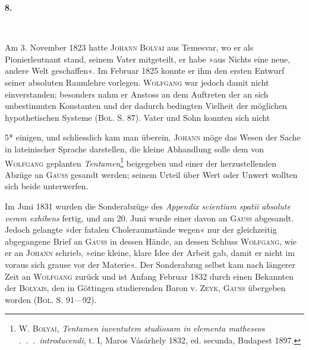 \clearpage\begingroup{}
\renewcommand{\thefootnote}{\arabic{footnote})}\setcounter{footnote}{0}
\begin{center}
\textbf{8.}\par\smallskip
{}\\
\end{center}
\noindent\hspace*{\parindent}Am 3. November 1823 hatte \textsc{Johann Bolyai} aus Temesvar, wo er als
Pionierleutnant stand, seinem Vater mitgeteilt, er habe »aus Nichts eine neue,
andere Welt geschaffen«. Im Februar 1825 konnte er ihm den ersten Entwurf
seiner absoluten Raumlehre vorlegen. \textsc{Wolfgang} war jedoch damit nicht
einverstanden; besonders nahm er Anstoss an dem Auftreten der an sich unbestimmten
Konstanten und der dadurch bedingten Vielheit der möglichen
hypothetischen Systeme (\textsc{Bol.} S. 87). Vater und Sohn konnten sich nicht
\par\vfill\hfill{\footnotesize 5*}\hspace*{2em}
\clearpage{}\setcounter{footnote}{0}
\noindent einigen, und schliesslich kam man überein, \textsc{Johann} möge das Wesen der Sache
in lateinischer Sprache darstellen, die kleine Abhandlung solle dem von \textsc{Wolfgang}
geplanten \textit{Tentamen}\footnote{W. \textsc{Bolyai}, \textit{Tentamen iuventutem studiosam in elementa matheseos .\ .\ .\ introducendi}, t. I, Maros Vásárhely 1832, ed. secunda, Budapest 1897.} beigegeben und einer der herzustellenden Abzüge
an \textsc{Gauss} gesandt werden; seinem Urteil über Wert oder Unwert wollten sich
beide unterwerfen.
\par
Im Juni 1831 wurden die Sonderabzüge des \textit{Appendix scientiam spatii absolute
veram exhibens} fertig, und am 20. Juni wurde einer davon an \textsc{Gauss}
abgesandt. Jedoch gelangte »der fatalen Choleraumstände wegen« nur der
gleichzeitig abgegangene Brief an \textsc{Gauss} in dessen Hände, an dessen Schluss
\textsc{Wolfgang}, wie er an \textsc{Johann} schrieb, »eine kleine, klare Idee der Arbeit gab,
damit er nicht im voraus sich grause vor der Materie«. Der Sonderabzug
selbst kam nach längerer Zeit an \textsc{Wolfgang} zurück und ist Anfang Februar
1832 durch einen Bekannten der \textsc{Bolyais}, den in Göttingen studierenden
Baron v. \textsc{Zeyk}, \textsc{Gauss} übergeben worden (\textsc{Bol.} S. 91—92).
